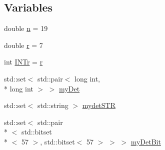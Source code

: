 \subsection*{Variables}
\begin{DoxyCompactItemize}
\item 
double \hyperlink{detBinary_8C_abe63e991a7bf5d666068b15c9064428d}{n} = 19
\item 
double \hyperlink{detBinary_8C_a880a49112fedae68e714341a9a082fb6}{r} = 7
\item 
int \hyperlink{detBinary_8C_a321e0b13b94d7a5f1dcbb07cb9fc325e}{I\-N\-Tr} = \hyperlink{detBinary_8C_a880a49112fedae68e714341a9a082fb6}{r}
\item 
std\-::set$<$ std\-::pair$<$ long int, \\*
long int $>$ $>$ \hyperlink{detBinary_8C_abb52eaa994bfb0dd4e03f9ea3a145f1e}{my\-Det}
\item 
std\-::set$<$ std\-::string $>$ \hyperlink{detBinary_8C_aab3e83510aa4019e3ec804ca9f491004}{mydet\-S\-T\-R}
\item 
std\-::set$<$ std\-::pair\\*
$<$ std\-::bitset\\*
$<$ 57 $>$, std\-::bitset$<$ 57 $>$ $>$ $>$ \hyperlink{detBinary_8C_a60ca3db1256f22188342eaf1658c6475}{my\-Det\-Bit}
\end{DoxyCompactItemize}


